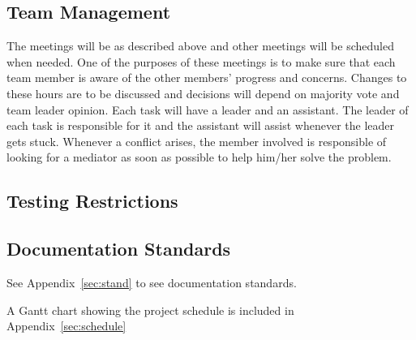 \subsection{Team Management}

The meetings will be as described above and other meetings will be scheduled
when needed. One of the purposes of these meetings is to make sure that each
team member is aware of the other members' progress and concerns. Changes to
these hours are to be discussed and decisions will depend on majority vote and
team leader opinion. Each task will have a leader and an assistant. The leader
of each task is responsible for it and the assistant will assist whenever the
leader gets stuck. Whenever a conflict arises, the member involved is
responsible of looking for a mediator as soon as possible to help him/her solve
the problem.

\subsection{Testing Restrictions}

\subsection{Documentation Standards}
See Appendix~\ref{sec:stand} to see documentation standards.

A Gantt chart showing the project schedule is included in Appendix~\ref{sec:schedule} 